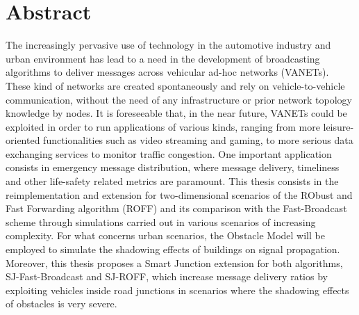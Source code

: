 
\cleardoublepage
{}
{}
\begingroup
\let\clearpage\relax
\let\cleardoublepage\relax
\let\cleardoublepage\relax

\chapter*{Abstract}

The increasingly pervasive use of technology in the automotive industry and urban environment has lead to a need in the development of broadcasting algorithms to deliver messages across vehicular ad-hoc networks (VANETs). These kind of networks are created spontaneously and rely on vehicle-to-vehicle communication, without the need of any infrastructure or prior network topology knowledge by nodes. It is foreseeable that, in the near future, VANETs could be exploited in order to run applications of various kinds, ranging from more leisure-oriented functionalities such as video streaming and gaming, to more serious data exchanging services to monitor traffic congestion. One important application consists in emergency message distribution, where message delivery, timeliness and other life-safety related metrics are paramount. This thesis consists in the reimplementation and extension for two-dimensional scenarios of the RObust and Fast Forwarding algorithm (ROFF) and its comparison with the Fast-Broadcast scheme through simulations carried out in various scenarios of increasing complexity. For what concerns urban scenarios, the Obstacle Model will be employed to simulate the shadowing effects of buildings on signal propagation. Moreover, this thesis proposes a Smart Junction extension for both algorithms, SJ-Fast-Broadcast and SJ-ROFF, which increase message delivery ratios by exploiting vehicles inside road junctions in scenarios where the shadowing effects of obstacles is very severe.

\endgroup			

\vfill


